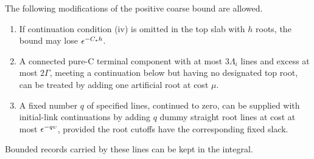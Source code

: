 \begin{lemma}\label{lem:dhm-dummies}
The following modifications of the positive coarse bound are allowed.
\begin{enumerate}[label=(\roman*)]
 \item If continuation condition (iv) is omitted in the top slab with
 \(h\) roots, the bound may lose \(\epsilon^{-C_*h}\).
 \item A connected pure-C terminal component with at most
 \(3\Lambda_i\) lines and excess at most \(2\Gamma\), meeting a
 continuation below but having no designated top root, can be treated
 by adding one artificial root at cost \(\mu\).
 \item A fixed number \(q\) of specified lines, continued to zero, can
 be supplied with initial-link continuations by adding \(q\) dummy
 straight root lines at cost at most \(\epsilon^{-q\upsilon}\), provided
 the root cutoffs have the corresponding fixed slack.
\end{enumerate}
Bounded records carried by these lines can be kept in the integral.
\end{lemma}
